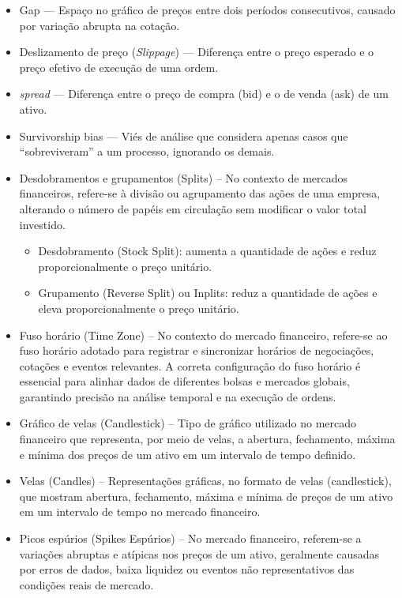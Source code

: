 

\begin{itemize}

\item{Gap} — Espaço no gráfico de preços entre dois períodos consecutivos, causado por variação abrupta na cotação.
\item{Deslizamento de preço (\textit{Slippage})} — Diferença entre o preço esperado e o preço efetivo de execução de uma ordem.
\item{\textit{spread}} — Diferença entre o preço de compra (bid) e o de venda (ask) de um ativo.
\item{Survivorship bias} — Viés de análise que considera apenas casos que “sobreviveram” a um processo, ignorando os demais.
\item{Desdobramentos e grupamentos (Splits)} – No contexto de mercados financeiros, refere-se à divisão ou agrupamento das ações de uma empresa, alterando o número de papéis em circulação sem modificar o valor total investido. 
\begin{itemize}
    \item {Desdobramento (Stock Split):} aumenta a quantidade de ações e reduz proporcionalmente o preço unitário.
    \item {Grupamento (Reverse Split) ou Inplits:} reduz a quantidade de ações e eleva proporcionalmente o preço unitário.
\end{itemize}
\item{Fuso horário (Time Zone)} – No contexto do mercado financeiro, refere-se ao fuso horário adotado para registrar e sincronizar horários de negociações, cotações e eventos relevantes. A correta configuração do fuso horário é essencial para alinhar dados de diferentes bolsas e mercados globais, garantindo precisão na análise temporal e na execução de ordens.
\item{Gráfico de velas (Candlestick)} – Tipo de gráfico utilizado no mercado financeiro que representa, por meio de velas, a abertura, fechamento, máxima e mínima dos preços de um ativo em um intervalo de tempo definido.
\item{Velas (Candles)} – Representações gráficas, no formato de velas (candlestick), que mostram abertura, fechamento, máxima e mínima de preços de um ativo em um intervalo de tempo no mercado financeiro.
\item{Picos espúrios (Spikes Espúrios)} – No mercado financeiro, referem-se a variações abruptas e atípicas nos preços de um ativo, geralmente causadas por erros de dados, baixa liquidez ou eventos não representativos das condições reais de mercado.

\end{itemize}
